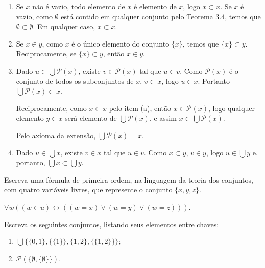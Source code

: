 \begin{enumerate}[label=(\alph{*})]
	\item 
		\begin{solucao} 
			Se $x$ não é vazio, todo elemento de $x$ é elemento de $x$, logo $x\subset x$. Se $x$ é vazio, como $\emptyset$ está contido em qualquer conjunto pelo Teorema 3.4, temos que $\emptyset\subset \emptyset$. Em qualquer caso, $x\subset x$. 
		\end{solucao}
	\item 
		\begin{solucao}
			Se $x\in y$, como $x$ é o único elemento do conjunto $\{x\}$, temos que $\{x\}\subset y$. Reciprocamente, se $\{x\}\subset y$, então $x\in y$.
		\end{solucao}
	\item 
		\begin{solucao}
			Dado $u\in\bigcup\mathcal{P}(x)$, existe $v\in\mathcal{P}(x)$ tal que $u\in v$. Como $\mathcal{P}(x)$ é o conjunto de todos os subconjuntos de $x$, $v\subset x$, logo $u\in x$. Portanto $\bigcup\mathcal{P}(x)\subset x$.
			
			Reciprocamente, como $x\subset x$ pelo item (a), então $x\in\mathcal{P}(x)$, logo qualquer elemento $y\in x$ será elemento de $\bigcup\mathcal{P}(x)$, e assim $x\subset \bigcup\mathcal{P}(x)$.
			
			Pelo axioma da extensão, $\bigcup\mathcal{P}(x)=x$.
		\end{solucao}
	\item 
		\begin{solucao}
			Dado $u\in\bigcup x$, existe $v\in x$ tal que $u\in v$. Como $x\subset y$, $v\in y$, logo $u\in\bigcup y$ e, portanto, $\bigcup x\subset\bigcup y$.
		\end{solucao}
\end{enumerate}

\begin{exercicio}
	Escreva uma fórmula de primeira ordem, na linguagem da teoria dos conjuntos, com quatro variáveis livres, que represente o conjunto $\{x,y,z\}$.
\end{exercicio}
\begin{solucao}
	$\forall w((w\in u)\leftrightarrow((w=x)\vee(w=y)\vee(w=z)))$.
\end{solucao}

\begin{exercicio}
	Escreva os seguintes conjuntos, listando seus elementos entre chaves:
	\begin{enumerate}[label=(\alph{*})]
		\item $\bigcup\{\{0,1\},\{\{1\}\},\{1,2\},\{\{1,2\}\}\}$;
		\item $\mathcal{P}(\{\emptyset,\{\emptyset\}\})$.
	\end{enumerate}
\end{exercicio}

